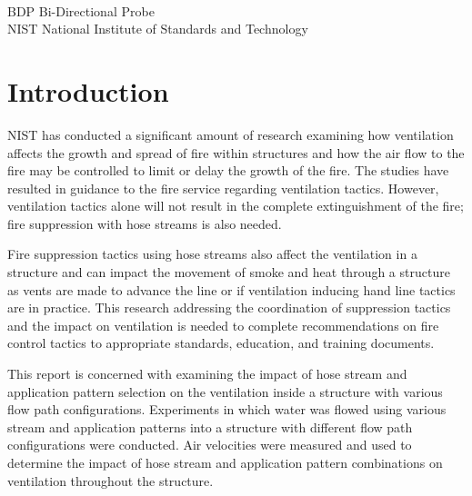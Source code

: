 \documentclass[12pt,oneside]{book}
\begin{document}
\begin{tabbing}
\hspace{1.5in} \= \\
BDP \> Bi-Directional Probe \\
NIST \> National Institute of Standards and Technology \\
\end{tabbing}

\mainmatter



\chapter{Introduction}
\label{chap:intro}
NIST has conducted a significant amount of research examining how ventilation affects the growth and spread of fire within structures and how the air flow to the fire may be controlled to limit or delay the growth of the fire. The studies have resulted in guidance to the fire service regarding ventilation tactics. However, ventilation tactics alone will not result in the complete extinguishment of the fire; fire suppression with hose streams is also needed.

Fire suppression tactics using hose streams also affect the ventilation in a structure and can impact the movement of smoke and heat through a structure as vents are made to advance the line or if ventilation inducing hand line tactics are in practice. This research addressing the coordination of suppression tactics and the impact on ventilation is needed to complete recommendations on fire control tactics to appropriate standards, education, and training documents.

This report is concerned with examining the impact of hose stream and application pattern selection on the ventilation inside a structure with various flow path configurations. Experiments in which water was flowed using various stream and application patterns into a structure with different flow path configurations were conducted. Air velocities were measured and used to determine the impact of hose stream and application pattern combinations on ventilation throughout the structure. 
\end{document}
